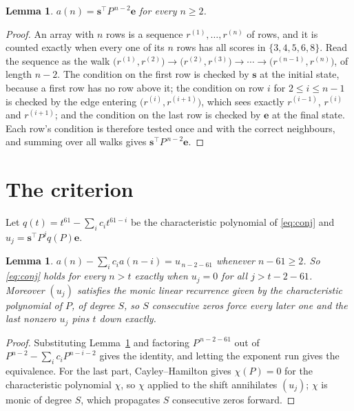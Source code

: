 \documentclass[11pt,a4paper]{article}
\theoremstyle{plain}
\newtheorem{lemma}[theorem]{Lemma}
\theoremstyle{definition}
\begin{document}
\begin{lemma}\label{lem:walk}
$a(n)=\mathbf{s}^{\!\top}P^{\,n-2}\mathbf{e}$ for every $n\ge2$.
\end{lemma}

\begin{proof}
An array with $n$ rows is a sequence $r^{(1)},\dots,r^{(n)}$ of rows, and it is counted
exactly when every one of its $n$ rows has all scores in $\{3,4,5,6,8\}$. Read the sequence as the
walk $\bigl(r^{(1)},r^{(2)}\bigr)\to\bigl(r^{(2)},r^{(3)}\bigr)\to\cdots\to
\bigl(r^{(n-1)},r^{(n)}\bigr)$, of length $n-2$. The condition on the first row is
checked by $\mathbf{s}$ at the initial state, because a first row has no row above it; the
condition on row $i$ for $2\le i\le n-1$ is checked by the edge entering
$\bigl(r^{(i)},r^{(i+1)}\bigr)$, which sees exactly $r^{(i-1)}$, $r^{(i)}$ and
$r^{(i+1)}$; and the condition on the last row is checked by $\mathbf{e}$ at the final
state. Each row's condition is therefore tested once and with the correct neighbours, and
summing over all walks gives $\mathbf{s}^{\!\top}P^{\,n-2}\mathbf{e}$.
\end{proof}

\section{The criterion}

Let $q(t)=t^{61}-\sum_i c_i t^{61-i}$ be the characteristic polynomial of
\eqref{eq:conj} and $u_j=\mathbf{s}^{\!\top}P^{j}q(P)\mathbf{e}$.

\begin{lemma}\label{lem:crit}
$a(n)-\sum_i c_i a(n-i)=u_{\,n-2-61}$ whenever $n-61\ge2$. So \eqref{eq:conj}
holds for every $n>t$ exactly when $u_j=0$ for all $j>t-2-61$. Moreover $(u_j)$
satisfies the monic linear recurrence given by the characteristic polynomial of $P$, of
degree $S$, so $S$ consecutive zeros force every later one and the last nonzero $u_j$ pins
$t$ down exactly.
\end{lemma}

\begin{proof}
Substituting Lemma~\ref{lem:walk} and factoring $P^{\,n-2-61}$ out of
$P^{n-2}-\sum_i c_i P^{n-i-2}$ gives the identity, and letting the exponent run gives the
equivalence. For the last part, Cayley--Hamilton gives $\chi(P)=0$ for the characteristic
polynomial $\chi$, so $\chi$ applied to the shift annihilates $(u_j)$; $\chi$ is monic of
degree $S$, which propagates $S$ consecutive zeros forward.
\end{proof}
\end{document}
